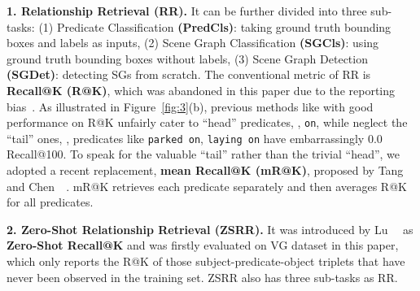 \documentclass[10pt,twocolumn,letterpaper]{article}
\begin{document}
\noindent\textbf{1. Relationship Retrieval (RR).} It can be further divided into three sub-tasks: (1) Predicate Classification \textbf{(PredCls)}: taking ground truth bounding boxes and labels as inputs, (2) Scene Graph Classification \textbf{(SGCls)}: using ground truth bounding boxes without labels, (3) Scene Graph Detection \textbf{(SGDet)}: detecting SGs from scratch. The conventional metric of RR is \textbf{Recall@K (R@K)}, which was abandoned in this paper due to the reporting bias~\cite{misra2016seeing}. As illustrated in Figure~\ref{fig:3}(b), previous methods like \cite{zellers2018neural} with good performance on R@K unfairly cater to ``head'' predicates, \eg, \texttt{on}, while neglect the ``tail'' ones, \eg, predicates like \texttt{parked on}, \texttt{laying on} have embarrassingly 0.0 Recall@100. To speak for the valuable ``tail'' rather than the trivial ``head'', we adopted a recent replacement, \textbf{mean Recall@K (mR@K)}, proposed by Tang~\etal~\cite{tang2019learning} and Chen~\etal~\cite{chen2019knowledge}. mR@K retrieves each predicate separately and then averages R@K for all predicates. 

\noindent\textbf{2. Zero-Shot Relationship Retrieval (ZSRR).} It was introduced by Lu~\etal~\cite{lu2016visual} as \textbf{Zero-Shot Recall@K} and was firstly evaluated on VG dataset in this paper, which only reports the R@K of those subject-predicate-object triplets that have never been observed in the training set. ZSRR also has three sub-tasks as RR.
\end{document}
